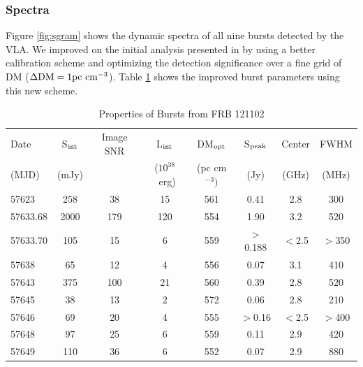 \documentclass[twocolumn]{aastex61}
\newcommand{\frb}{FRB 121102}
\begin{document}
\subsubsection{Spectra}
\label{sec:spec}
Figure \ref{fig:sgram} shows the dynamic spectra of all nine bursts detected by the VLA. We improved on the initial analysis presented in \citet{LOC} by using a better calibration scheme and optimizing the detection significance over a fine grid of DM ($\Delta \rm{DM}=1 \rm{pc}\ \rm{cm}^{-3}$). Table \ref{tab:spec} shows the improved burst parameters using this new scheme. 

\begin{table}
\caption{Properties of Bursts from \frb}
\centering
\begin{tabular}{lccccccc}
\hline
Date                & S$_{\rm{int}}$  & Image SNR & L$_{\rm{int}}$ & DM$_{\rm{opt}}$ & S$_{\rm{peak}}$  & Center & FWHM \\
(MJD)               & (mJy)           &           & ($10^{38}$\ erg) & (pc cm$^{-3})$ & (Jy) & (GHz)  & (MHz) \\ \hline
57623               & 258             & 38        & 15   & 561 & 0.41                                    & 2.8 & 300 \\
57633.68            & 2000            & 179       & 120  & 554 & 1.90                                    & 3.2 & 520 \\
57633.70\tablenotemark{a} & 105       & 15        & 6    & 559 & $>$0.188                                & $<$2.5 & $>$350 \\
57638               & 65              & 12        & 4    & 556 & 0.07                                    & 3.1 & 410 \\
57643               & 375             & 100       & 21   & 560 & 0.39                                    & 2.8 & 520 \\
57645               & 38              & 13        & 2    & 572 & 0.06                                    & 2.8 & 210 \\
57646\tablenotemark{a} & 69           & 20        & 4    & 555 & $>$0.16                                 & $<$2.5 & $>$400 \\
57648\tablenotemark{b} & 97           & 25        & 6    & 559 & 0.11                                    & 2.9 & 420 \\
57649               & 110             & 36        & 6    & 552 & 0.07                                    & 2.9 & 880 \\ \hline
\end{tabular}
\label{tab:spec}
\end{table} 
\end{document}
